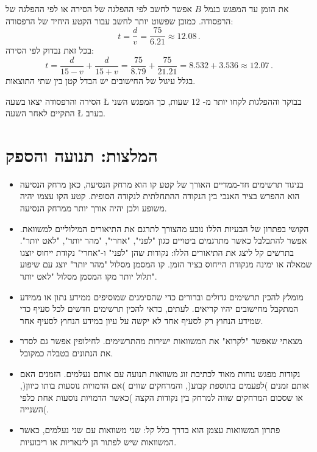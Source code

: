 \smallskip

את הזמן עד המפגש בנמל 
$B$
אפשר לחשב לפי ההפלגה של הסירה או לפי ההפלגה של הרפסודה. כמובן שפשוט יותר לחשב עבור הקטע היחיד של הרפסודה:
\[
t = \frac{d}{v} = \frac{75}{6.21} \approx 12.08\,.
\]
בכל זאת נבדוק לפי הסירה:
\[
t = \frac{d}{15-v} + \frac{d}{15+v} = \frac{75}{8.79} + \frac{75}{21.21}= 8.532 + 3.536 \approx 12.07\,.
\]
בגלל עיגול של החישובים יש הבדל קטן בין שתי התוצאות.

הסירה והרפסודה יצאו בשעה
\L{}
בבוקר וההפלגות לקחו יותר מ-%
$12$
שעות, כך המפגש השני התקיים לאחר השעה
\L{}
בערב.



\clearpage
{}


\section*{המלצות: תנועה והספק}


\begin{itemize}

\item
בניגוד תרשימים חד-ממדיים האורך של קטע קו הוא מרחק הנסיעה, כאן מרחק הנסיעה הוא ההפרש בציר האנכי בין הנקודה ההתחלתית לנקודה הסופית. קטע הקו עצמו יהיה משופע ולכן יהיה אורך יותר ממרחק הנסיעה.

\item
הקושי בפתרון של הבעיות הללו נובע מהצורך לתרגם את התיאורים המילוליים למשוואת. אפשר להתבלבל כאשר מתרגמים ביטויים כגון "לפני", "אחרי", "מהר יותר", "לאט יותר".  בתרשים קל ליצג את התיאורים הללו: נקודות שהן "לפני" ו-"אחרי" נקודת ייחוס יוצגו שמאלה או ימינה מנקודת הייחוס בציר הזמן. קו המסמן מסלול "מהר יותר" יוצג עם שיפוע תלול יותר מקו המסמן מסלול "לאט יותר".

\item
מומלץ להכין תרשימים גדולים וברורים כדי שהסימנים שמוסיפים ממידע נתון או ממידע המתקבל מחישובים יהיו קריאים. לעתים, כדאי להכין תרשימים חדשים לכל סעיף כדי שמידע הנחוץ רק לסעיף אחד לא יקשה על עיון במידע הנחוץ לסעיף אחר.

\item
מצאתי שאפשר "לקרוא" את המשוואות ישירות מהתרשימים. לחילופין אפשר גם לסדר את הנתונים בטבלה כמקובל.

\item 
נקודות מפגש נוחות מאוד לכתיבת זוג משוואות תנועה עם אותם נעלמים. הזמנים האם אותם זמנים )לפעמים בתוספת קבוע(, והמרחקים שווים )אם הדמויות נוסעות בותו כיוון(, או שסכום המרחקים שווה למרחק בין נקודות הקצה )כאשר הדמויות נוסעות אחת כלפי השנייה(.

\item 
פתרון המשוואות עצמן הוא בדרך כלל קל: שני משוואות עם שני נעלמים, כאשר המשוואות שיש לפתור הן לינאריות או ריבועיות.

\end{itemize}

\npchap
